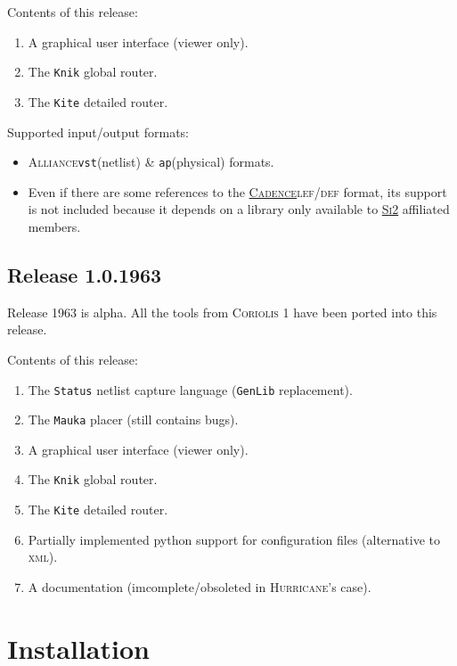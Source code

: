\documentclass[11pt]{article}
\newcommand{\xhref}        [2]{\href{#2}{#1}}
\newcommand{\xhref}        [2]{\htmladdnormallink{#1}{#2}}
\newcommand {\XML}                {\textsc{xml}\xspace}
\newcommand {\SiII}               {\xhref{\textsc{Si2}}{http://www.si2.org/}\xspace}
\newcommand {\Cadence}            {\xhref{\textsc{Cadence}}{http://www.cadence.com/}\xspace}
\newcommand {\LEFDEF}             {\textsc{lef/def}\xspace}
\newcommand {\Alliance}           {\textsc{Alliance}\xspace}
\newcommand {\vst}                {\texttt{vst}\xspace}
\newcommand {\ap}                 {\texttt{ap}\xspace}
\newcommand {\CoriolisI}          {\textsc{Coriolis 1}\xspace}
\newcommand {\Hurricane}          {\textsc{Hurricane}\xspace}
\newcommand {\Stratus}            {\texttt{Status}\xspace}
\newcommand {\GenLib}             {\texttt{GenLib}\xspace}
\newcommand {\Mauka}              {\texttt{Mauka}\xspace}
\newcommand {\Knik}               {\texttt{Knik}\xspace}
\newcommand {\Kite}               {\texttt{Kite}\xspace}
\begin{document}
 \noindent Contents of this release:
 \begin{enumerate}
   \item A graphical user interface (viewer only).
   \item The \Knik global router.
   \item The \Kite detailed router.
 \end{enumerate}

 \noindent Supported input/output formats:
 \begin{itemize}
   \item \Alliance \vst (netlist) \& \ap (physical) formats.
   \item Even if there are some references to the \Cadence \LEFDEF format, its
         support is not included because it depends on a library only available
         to \SiII affiliated members.
 \end{itemize}

 \subsection{Release 1.0.1963}

 Release 1963 is alpha. All the tools from \CoriolisI have been ported into
 this release.

 \noindent Contents of this release:
 \begin{enumerate}
   \item The \Stratus netlist capture language (\GenLib replacement).
   \item The \Mauka placer (still contains bugs).
   \item A graphical user interface (viewer only).
   \item The \Knik global router.
   \item The \Kite detailed router.
   \item Partially implemented python support for configuration files
         (alternative to \XML).
   \item A documentation (imcomplete/obsoleted in \Hurricane's case). 
 \end{enumerate}

 \section{Installation}
\end{document}
